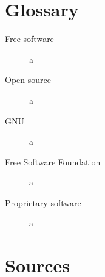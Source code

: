 \documentclass[12pt]{article}
\begin{document}
\section*{Glossary}

\begin{description}
  \item[Free software]{a}
  \item[Open source]{a}
  \item[GNU]{a}
  \item[Free Software Foundation]{a}
  \item[Proprietary software]{a}
\end{description}

\section*{Sources}



\end{document}
